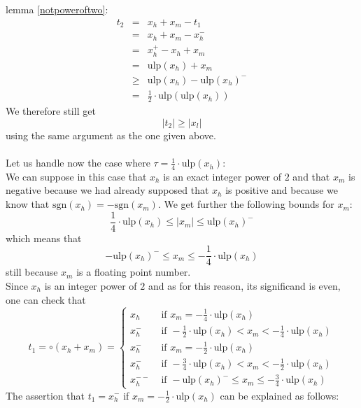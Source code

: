 \documentclass[a4paper,10pt,twoside]{article}
\newenvironment{proof}[1][Proof]{\begin{trivlist}
\item[\hskip \labelsep {\bfseries #1}]}{\end{trivlist}}
\newcommand{\hi}{\ensuremath{\mathit{h}}}
\newcommand{\mi}{\ensuremath{\mathit{m}}}
\newcommand{\lo}{\ensuremath{\mathit{l}}}
\newcommand{\mUlp}{\ensuremath{\mathrm{ulp}}}
\newcommand{\sgn}{\ensuremath{\mathrm{sgn}}}
\begin{document}
\begin{proof}
lemma \ref{notpoweroftwo}:
\begin{eqnarray*}
t_2 & = & x_\hi + x_\mi - t_1 \\
& = & x_\hi + x_\mi - x_\hi^- \\
& = & x_\hi^+ - x_\hi + x_\mi \\
& = & \mUlp\left( x_\hi \right) + x_\mi \\
& \geq & \mUlp\left( x_\hi \right) - \mUlp\left( x_\hi \right)^- \\
& = & \frac{1}{2} \cdot \mUlp\left( \mUlp \left( x_\hi \right) \right)
\end{eqnarray*}
We therefore still get
$$\left \vert t_2 \right \vert \geq \left \vert x_\lo \right \vert$$
using the same argument as the one given above. \\ ~ \\
Let us handle now the case where $\tau = \frac{1}{4} \cdot \mUlp\left( x_\hi \right)$: \\
We can suppose in this case that $x_\hi$ is an exact integer power of $2$ and that $x_\mi$ is negative
because we had already supposed that $x_\hi$ is positive and because we know that
$\sgn\left( x_\hi \right) = -\sgn\left( x_\mi \right)$. We get further the following bounds for $x_\mi$:
$$\frac{1}{4} \cdot \mUlp\left( x_\hi \right) \leq \left \vert x_\mi \right \vert \leq \mUlp\left( x_\hi \right)^-$$
which means that
$$-\mUlp\left( x_\hi \right)^- \leq x_\mi \leq -\frac{1}{4} \cdot \mUlp\left( x_\hi \right)$$
still because $x_\mi$ is a floating point number. \\
Since $x_\hi$ is an integer power of $2$ and as for this reason, its significand is even, one can check that
$$t_1 = \circ \left( x_\hi + x_\mi \right) = \left \lbrace \begin{array}{ll}
x_\hi & \mbox{ if } x_\mi = -\frac{1}{4} \cdot \mUlp\left( x_\hi \right) \\
x_\hi^- & \mbox{ if } -\frac{1}{2} \cdot \mUlp\left( x_\hi \right) < x_\mi < -\frac{1}{4} \cdot \mUlp\left( x_\hi \right) \\
x_\hi^- & \mbox{ if } x_\mi = -\frac{1}{2} \cdot \mUlp\left( x_\hi \right) \\
x_\hi^- & \mbox{ if } -\frac{3}{4} \cdot \mUlp\left( x_\hi \right) < x_\mi < -\frac{1}{2} \cdot \mUlp\left( x_\hi \right) \\
x_\hi^{--} & \mbox{ if } -\mUlp\left( x_\hi \right)^- \leq x_\mi \leq -\frac{3}{4} \cdot \mUlp\left( x_\hi \right)
\end{array} \right.
$$
The assertion that $t_1 = x_\hi^-$ if $x_\mi = -\frac{1}{2} \cdot \mUlp\left( x_\hi \right)$ can be explained as follows:\\

\end{proof}
\end{document}
